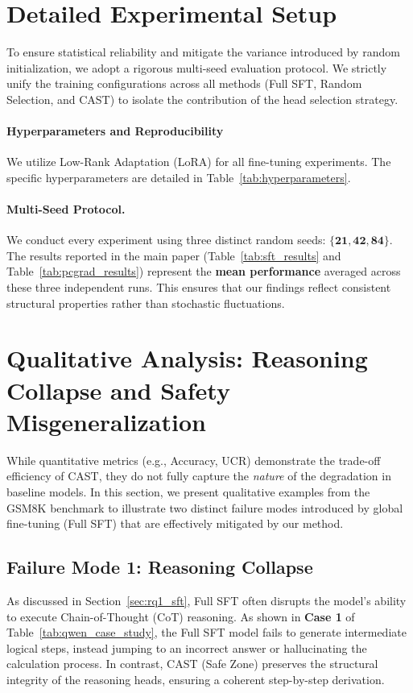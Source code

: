 \documentclass[11pt]{article}
\begin{document}
\section{Detailed Experimental Setup}
\label{app:setup}

To ensure statistical reliability and mitigate the variance introduced by random initialization, we adopt a rigorous multi-seed evaluation protocol. 
We strictly unify the training configurations across all methods (Full SFT, Random Selection, and CAST) to isolate the contribution of the head selection strategy.


\paragraph{Hyperparameters and Reproducibility}
We utilize Low-Rank Adaptation (LoRA) for all fine-tuning experiments. The specific hyperparameters are detailed in Table~\ref{tab:hyperparameters}. 

\paragraph{Multi-Seed Protocol.} We conduct every experiment using three distinct random seeds: $\mathbf{\{21, 42, 84\}}$. The results reported in the main paper (Table~\ref{tab:sft_results} and Table~\ref{tab:pcgrad_results}) represent the \textbf{mean performance} averaged across these three independent runs. This ensures that our findings reflect consistent structural properties rather than stochastic fluctuations.






\section{Qualitative Analysis: Reasoning Collapse and Safety Misgeneralization}
\label{app:case_study}

While quantitative metrics (e.g., Accuracy, UCR) demonstrate the trade-off efficiency of CAST, they do not fully capture the \textit{nature} of the degradation in baseline models. In this section, we present qualitative examples from the GSM8K benchmark to illustrate two distinct failure modes introduced by global fine-tuning (Full SFT) that are effectively mitigated by our method.

\subsection{Failure Mode 1: Reasoning Collapse}
As discussed in Section~\ref{sec:rq1_sft}, Full SFT often disrupts the model's ability to execute Chain-of-Thought (CoT) reasoning. As shown in \textbf{Case 1} of Table~\ref{tab:qwen_case_study}, the Full SFT model fails to generate intermediate logical steps, instead jumping to an incorrect answer or hallucinating the calculation process. In contrast, CAST (Safe Zone) preserves the structural integrity of the reasoning heads, ensuring a coherent step-by-step derivation.
\end{document}
